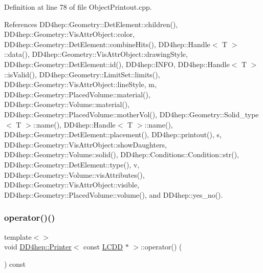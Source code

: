 Definition at line 78 of file Object\+Printout.\+cpp.



References D\+D4hep\+::\+Geometry\+::\+Det\+Element\+::children(), D\+D4hep\+::\+Geometry\+::\+Vis\+Attr\+Object\+::color, D\+D4hep\+::\+Geometry\+::\+Det\+Element\+::combine\+Hits(), D\+D4hep\+::\+Handle$<$ T $>$\+::data(), D\+D4hep\+::\+Geometry\+::\+Vis\+Attr\+Object\+::drawing\+Style, D\+D4hep\+::\+Geometry\+::\+Det\+Element\+::id(), D\+D4hep\+::\+I\+N\+FO, D\+D4hep\+::\+Handle$<$ T $>$\+::is\+Valid(), D\+D4hep\+::\+Geometry\+::\+Limit\+Set\+::limits(), D\+D4hep\+::\+Geometry\+::\+Vis\+Attr\+Object\+::line\+Style, m, D\+D4hep\+::\+Geometry\+::\+Placed\+Volume\+::material(), D\+D4hep\+::\+Geometry\+::\+Volume\+::material(), D\+D4hep\+::\+Geometry\+::\+Placed\+Volume\+::mother\+Vol(), D\+D4hep\+::\+Geometry\+::\+Solid\+\_\+type$<$ T $>$\+::name(), D\+D4hep\+::\+Handle$<$ T $>$\+::name(), D\+D4hep\+::\+Geometry\+::\+Det\+Element\+::placement(), D\+D4hep\+::printout(), s, D\+D4hep\+::\+Geometry\+::\+Vis\+Attr\+Object\+::show\+Daughters, D\+D4hep\+::\+Geometry\+::\+Volume\+::solid(), D\+D4hep\+::\+Conditions\+::\+Condition\+::str(), D\+D4hep\+::\+Geometry\+::\+Det\+Element\+::type(), v, D\+D4hep\+::\+Geometry\+::\+Volume\+::vis\+Attributes(), D\+D4hep\+::\+Geometry\+::\+Vis\+Attr\+Object\+::visible, D\+D4hep\+::\+Geometry\+::\+Placed\+Volume\+::volume(), and D\+D4hep\+::yes\+\_\+no().

\hypertarget{struct_d_d4hep_1_1_printer_acee5e080faf761fb4c3ee6faccb0d96e}{}\label{struct_d_d4hep_1_1_printer_acee5e080faf761fb4c3ee6faccb0d96e} 
\subsubsection{\texorpdfstring{operator()()}{operator()()}\hspace{0.1cm}{\footnotesize\ttfamily [11/12]}}
{\footnotesize\ttfamily template$<$$>$ \\
void \hyperlink{struct_d_d4hep_1_1_printer}{D\+D4hep\+::\+Printer}$<$ const \hyperlink{class_d_d4hep_1_1_geometry_1_1_l_c_d_d}{L\+C\+DD} $\ast$ $>$\+::operator() (\begin{DoxyParamCaption}\item[{const \hyperlink{class_d_d4hep_1_1_geometry_1_1_l_c_d_d}{L\+C\+DD} $\ast$const \&}]{ }\end{DoxyParamCaption}) const}



